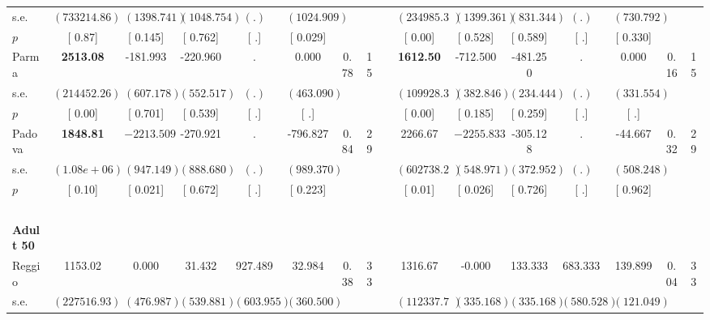 \begin{longtable}{L{8em} c c c c c c c p{1em} c c c c c c c}
\quad \quad \quad \quad s.e.& $ (733214.86)$ & $ ( 1398.741)$ & $ ( 1048.754)$ & $ (        .)$ & $ ( 1024.909)$ & & & & $ (234985.34)$ & $ ( 1399.361)$ & $ (  831.344)$ & $ (        .)$ & $ (  730.792)$ & &  \\*
\quad \quad \quad \quad $ p$ & [     0.87] & [    0.145] & [    0.762] & [        .] & [    0.029] & & & & [     0.00] & [    0.528] & [    0.589] & [        .] & [    0.330] & &  \\[1em]
\quad \quad \quad Parma& \textbf{  2513.08} &  -181.993 &  -220.960 &         . &     0.000 &      0.78 &        15 & & \textbf{  1612.50} &  -712.500 &  -481.250 &         . &     0.000 &      0.16 &        15  \\*
\quad \quad \quad \quad s.e.& $ (214452.26)$ & $ (  607.178)$ & $ (  552.517)$ & $ (        .)$ & $ (  463.090)$ & & & & $ (109928.39)$ & $ (  382.846)$ & $ (  234.444)$ & $ (        .)$ & $ (  331.554)$ & &  \\*
\quad \quad \quad \quad $ p$ & [     0.00] & [    0.701] & [    0.539] & [        .] & [        .] & & & & [     0.00] & [    0.185] & [    0.259] & [        .] & [        .] & &  \\[1em]
\quad \quad \quad Padova& \textbf{  1848.81} & $ \mathbf{-2213.509}$ &  -270.921 &         . &  -796.827 &      0.84 &        29 & & 2266.67 & $ \mathbf{-2255.833}$ &  -305.128 &         . &   -44.667 &      0.32 &        29  \\*
\quad \quad \quad \quad s.e.& $ ( 1.08e+06)$ & $ (  947.149)$ & $ (  888.680)$ & $ (        .)$ & $ (  989.370)$ & & & & $ (602738.20)$ & $ (  548.971)$ & $ (  372.952)$ & $ (        .)$ & $ (  508.248)$ & &  \\*
\quad \quad \quad \quad $ p$ & [     0.10] & [    0.021] & [    0.672] & [        .] & [    0.223] & & & & [     0.01] & [    0.026] & [    0.726] & [        .] & [    0.962] & &  \\[1em]
~\\[1em]
\quad \quad \textbf{Adult 50} & & & & & & & & & & & & & & & \\* 
\quad \quad \quad Reggio& 1153.02 &     0.000 &    31.432 &   927.489 &    32.984 &      0.38 &        33 & & 1316.67 &    -0.000 &   133.333 &   683.333 &   139.899 &      0.04 &        33  \\*
\quad \quad \quad \quad s.e.& $ (227516.93)$ & $ (  476.987)$ & $ (  539.881)$ & $ (  603.955)$ & $ (  360.500)$ & & & & $ (112337.70)$ & $ (  335.168)$ & $ (  335.168)$ & $ (  580.528)$ & $ (  121.049)$ & &  \\*

\end{longtable}
